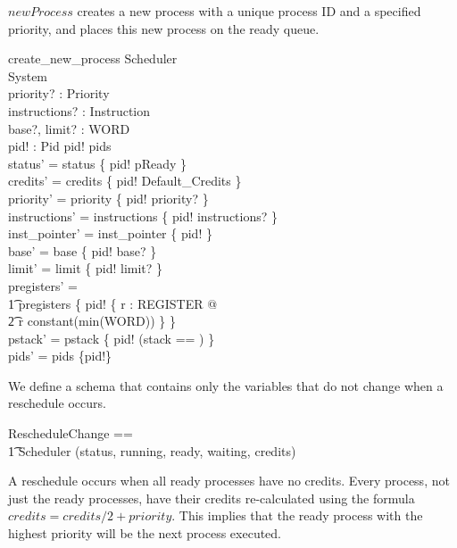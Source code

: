 \documentclass{article}
\begin{document}
$newProcess$ creates a new process with a unique process ID and a
specified priority, and places this new process on the ready queue.

\begin{schema}{create\_new\_process}
  \Delta Scheduler\\
  \Xi System\\
  priority? : Priority\\
  instructions? : \seq Instruction\\
  base?, limit? : WORD\\
  pid! : Pid
\where
  pid! \notin pids\\
  status' = status \cup \{ pid! \mapsto pReady \}\\
  credits' = credits \cup \{ pid! \mapsto Default\_Credits \}\\
  priority' = priority \cup \{ pid! \mapsto priority? \}\\
  instructions' = instructions \cup \{ pid! \mapsto instructions? \}\\
  inst\_pointer' = inst\_pointer \cup \{ pid!  \}\\
  base' = base \cup \{ pid! \mapsto base? \}\\
  limit' = limit \cup \{ pid! \mapsto limit? \}\\
  pregisters' =\\
    \t1 pregisters \cup \{ pid! \mapsto \{ r : REGISTER @ \\
      \t2 r \mapsto constant(min(WORD)) \} \}\\
  pstack' =
    pstack \cup \{ pid! \mapsto (\lblot stack == \langle \rangle \rblot) \}\\
    pids' = pids \cup \{pid!\}
\end{schema}

We define a schema that contains only the variables that do not change
when a reschedule occurs.

\begin{zed}
  RescheduleChange == \\
    \t1 Scheduler \hide (status, running, ready, waiting, credits)
\end{zed}

A reschedule occurs when all ready processes have no credits. Every
process, not just the ready processes, have their credits
re-calculated using the formula $credits = credits/2 + priority$. This
implies that the ready process with the highest priority will be the
next process executed.
\end{document}
